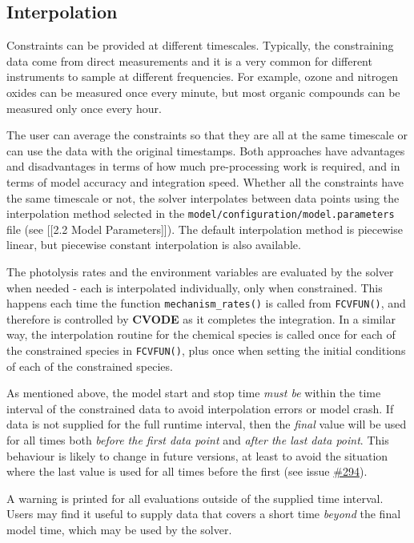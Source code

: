 \subsection{Interpolation} \label{subsec:interpolation}

Constraints can be provided at different timescales. Typically, the
constraining data come from direct measurements and it is a very
common for different instruments to sample at different
frequencies. For example, ozone and nitrogen oxides can be measured
once every minute, but most organic compounds can be measured only
once every hour.

The user can average the constraints so that they are all at the same
timescale or can use the data with the original timestamps. Both
approaches have advantages and disadvantages in terms of how much
pre-processing work is required, and in terms of model accuracy and
integration speed. Whether all the constraints have the same timescale
or not, the solver interpolates between data points using the
interpolation method selected in the
\texttt{model/configuration/model.parameters} file (see {[}{[}2.2
Model Parameters{]}{]}). The default interpolation method is piecewise
linear, but piecewise constant interpolation is also available.

The photolysis rates and the environment variables are evaluated by
the solver when needed - each is interpolated individually, only when
constrained. This happens each time the function
\texttt{mechanism\_rates()} is called from \texttt{FCVFUN()}, and
therefore is controlled by \textbf{CVODE} as it completes the
integration. In a similar way, the interpolation routine for the
chemical species is called once for each of the constrained species in
\texttt{FCVFUN()}, plus once when setting the initial conditions of
each of the constrained species.

As mentioned above, the model start and stop time \emph{must be}
within the time interval of the constrained data to avoid
interpolation errors or model crash. If data is not supplied for the
full runtime interval, then the \emph{final} value will be used for
all times both \emph{before the first data point} and \emph{after the
  last data point}. This behaviour is likely to change in future
versions, at least to avoid the situation where the last value is used
for all times before the first (see issue
\href{https://github.com/AtChem/AtChem2/issues/294}{\#294}).

A warning is printed for all evaluations outside of the supplied time
interval. Users may find it useful to supply data that covers a short
time \emph{beyond} the final model time, which may be used by the
solver.

